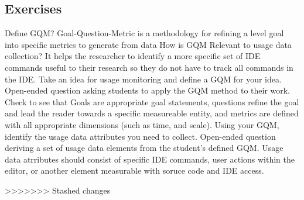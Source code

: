 \subsection{Exercises}

\begin{ExerciseList}
 \Exercise[type={long}, difficulty={0}]Define GQM? 
  \Answer Goal-Question-Metric is a methodology for refining a level goal into specific metrics to generate from data
 \Exercise[ type={long}, difficulty={1}]How is GQM Relevant to usage data collection? 
  \Answer It helps the researcher to identify a more specific set of IDE commands useful to their research so they do not have to track all commands in the IDE.
  \Exercise[ type={long}, difficulty={2}]Take an idea for usage monitoring and define a GQM for your idea. 
  \Answer Open-ended question asking students to apply the GQM method to their work.  Check to see that Goals are appropriate goal statements, questions refine the goal and lead the reader towards a specific measureable entity, and metrics are defined with all appropriate dimensions (such as time, and scale).
  \Exercise[ type={long}, difficulty={2}]Using your GQM, identify the usage data attributes you need to collect. 
  \Answer Open-ended question deriving a set of usage data elements from the student's defined GQM.  Usage data atrributes should consist of specific IDE commands, user actions within the editor, or another element measurable with soruce code and IDE access. 

\end{ExerciseList}
>>>>>>> Stashed changes
